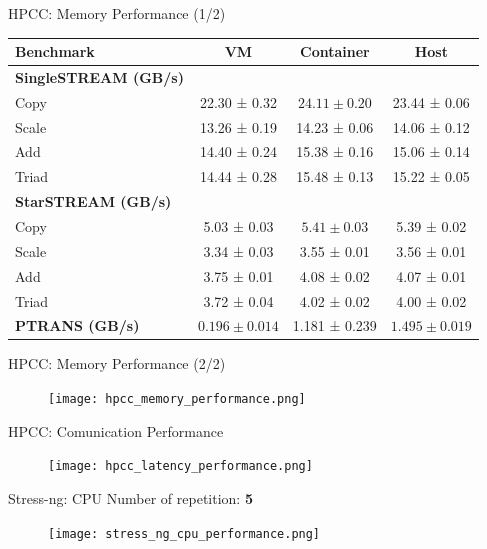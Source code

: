\documentclass[10pt]{beamer}
\begin{document}
\begin{frame}{HPCC: Memory Performance (1/2)}
  \begin{table}[htbt]
  \centering
  \footnotesize
  \begin{tabular}{lccc}
  \toprule
  \textbf{Benchmark} & \textbf{VM} & \textbf{Container} & \textbf{Host} \\
  \midrule
  \textbf{SingleSTREAM (GB/s)} & & & \\
  Copy   & 22.30 ± 0.32 & $\mathbf{24.11 \pm 0.20}$ & 23.44 ± 0.06 \\
  Scale  & 13.26 ± 0.19 & 14.23 ± 0.06 & 14.06 ± 0.12 \\
  Add    & 14.40 ± 0.24 & 15.38 ± 0.16 & 15.06 ± 0.14 \\
  Triad  & 14.44 ± 0.28 & 15.48 ± 0.13 & 15.22 ± 0.05 \\
  \midrule
  \textbf{StarSTREAM (GB/s)} & & & \\
  Copy   & 5.03 ± 0.03 & $\mathbf{5.41 \pm 0.03}$ & 5.39 ± 0.02 \\
  Scale  & 3.34 ± 0.03 & 3.55 ± 0.01 & 3.56 ± 0.01 \\
  Add    & 3.75 ± 0.01 & 4.08 ± 0.02 & 4.07 ± 0.01 \\
  Triad  & 3.72 ± 0.04 & 4.02 ± 0.02 & 4.00 ± 0.02 \\
  \midrule
  \textbf{PTRANS (GB/s)} & $0.196 \pm 0.014$ & 1.181 ± 0.239 & $\mathbf{1.495 \pm 0.019}$ \\
  \bottomrule
  \end{tabular}
  \end{table}

\end{frame}



\begin{frame}{HPCC: Memory Performance (2/2)}
  \begin{figure}
    \centering
    \texttt{[image: hpcc\_memory\_performance.png]}
  \end{figure}
\end{frame}

\begin{frame}{HPCC: Comunication Performance}
  \begin{figure}
    \centering
    \texttt{[image: hpcc\_latency\_performance.png]}
  \end{figure}

\end{frame}

\begin{frame}{Stress-ng: CPU}
  Number of repetition: \textbf{5}
  \begin{figure}
    \centering
    \texttt{[image: stress\_ng\_cpu\_performance.png]}
  \end{figure}
\end{frame}
\end{document}
